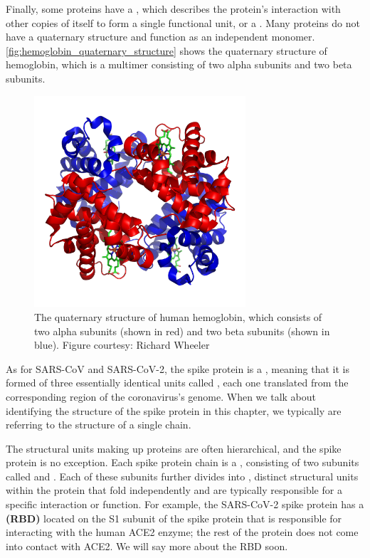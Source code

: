 Finally, some proteins have a , which describes the protein’s interaction with other copies of itself to form a single functional unit, or a . Many proteins do not have a quaternary structure and function as an independent monomer. \autoref{fig:hemoglobin_quaternary_structure} shows the quaternary structure of hemoglobin, which is a multimer consisting of two alpha subunits and two beta subunits.

\begin{figure}[h]
	\centering
	\mySfFamily
	\includegraphics[width = 0.7\textwidth]{../images/hemoglobin_quaternary_structure.png}
	\caption{The quaternary structure of human hemoglobin, which consists of two alpha subunits (shown in red) and two beta subunits (shown in blue). Figure courtesy: Richard Wheeler}
	\label{fig:hemoglobin_quaternary_structure}
\end{figure}

As for SARS-CoV and SARS-CoV-2, the spike protein is a , meaning that it is formed of three essentially identical units called , each one translated from the corresponding region of the coronavirus's genome. When we talk about identifying the structure of the spike protein in this chapter, we typically are referring to the structure of a single chain.

The structural units making up proteins are often hierarchical, and the spike protein is no exception. Each spike protein chain is a , consisting of two subunits called  and . Each of these subunits further divides into , distinct structural units within the protein that fold independently and are typically responsible for a specific interaction or function. For example, the SARS-CoV-2 spike protein has a  \textbf{(RBD)} located on the S1 subunit of the spike protein that is responsible for interacting with the human ACE2 enzyme; the rest of the protein does not come into contact with ACE2. We will say more about the RBD soon.

